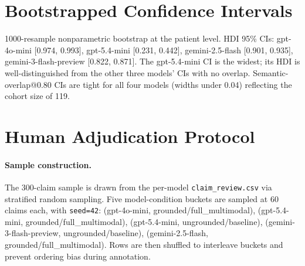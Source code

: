\documentclass{article}
\theoremstyle{plain}
\begin{document}
\section{Bootstrapped Confidence Intervals}
\label{app:bootstrap}

1000-resample nonparametric bootstrap at the patient level. HDI 95\% CIs: gpt-4o-mini [0.974, 0.993], gpt-5.4-mini [0.231, 0.442], gemini-2.5-flash [0.901, 0.935], gemini-3-flash-preview [0.822, 0.871]. The gpt-5.4-mini CI is the widest; its HDI is well-distinguished from the other three models' CIs with no overlap. Semantic-overlap@0.80 CIs are tight for all four models (widths under 0.04) reflecting the cohort size of 119.

\section{Human Adjudication Protocol}
\label{app:adjudication}

\paragraph{Sample construction.} The 300-claim sample is drawn from the per-model \texttt{claim\_review.csv} via stratified random sampling. Five model-condition buckets are sampled at 60 claims each, with \texttt{seed=42}: (gpt-4o-mini, grounded/full\_multimodal), (gpt-5.4-mini, grounded/full\_multimodal), (gpt-5.4-mini, ungrounded/baseline), (gemini-3-flash-preview, ungrounded/baseline), (gemini-2.5-flash, grounded/full\_multimodal). Rows are then shuffled to interleave buckets and prevent ordering bias during annotation.
\end{document}
